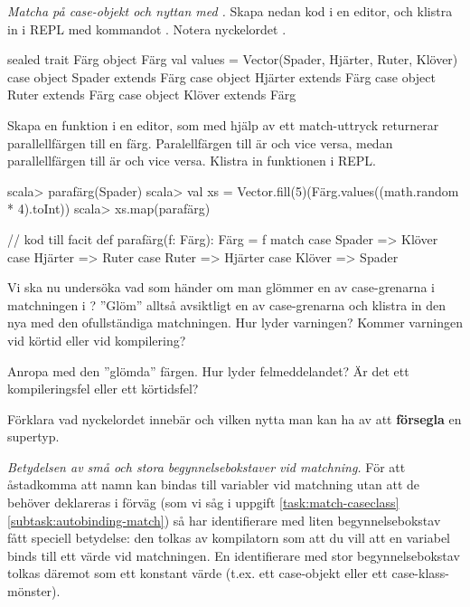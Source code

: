 \Task \emph{Matcha på case-objekt och nyttan med .} Skapa nedan kod i en editor, och klistra in i REPL med kommandot . Notera nyckelordet .
\begin{Code}
sealed trait Färg
object Färg { 
  val values = Vector(Spader, Hjärter, Ruter, Klöver) 
}
case object Spader  extends Färg
case object Hjärter extends Färg
case object Ruter   extends Färg
case object Klöver  extends Färg
\end{Code}

\Subtask Skapa en funktion  i en editor, som med hjälp av ett match-uttryck returnerar parallellfärgen till en färg. Paralellfärgen till  är  och vice versa, medan parallellfärgen till  är  och vice versa. Klistra in funktionen i REPL.
\begin{REPL}
scala> parafärg(Spader)
scala> val xs = Vector.fill(5)(Färg.values((math.random * 4).toInt))  
scala> xs.map(parafärg)
\end{REPL}

\begin{Code}
// kod till facit
def parafärg(f: Färg): Färg = f match {
  case Spader  => Klöver
  case Hjärter => Ruter
  case Ruter   => Hjärter
  case Klöver  => Spader
}
\end{Code}

\Subtask Vi ska nu undersöka vad som händer om man glömmer en av case-grenarna i matchningen i ? ''Glöm'' alltså avsiktligt en av case-grenarna och klistra in den nya  med den ofullständiga matchningen. Hur lyder varningen? Kommer varningen vid körtid eller vid kompilering? 

\Subtask Anropa  med den ''glömda'' färgen. Hur lyder felmeddelandet? Är det ett kompileringsfel eller ett körtidsfel?

\Subtask\Pen Förklara vad nyckelordet  innebär och vilken nytta man kan ha av att \textbf{försegla} en supertyp.


\Task \emph{Betydelsen av små och stora begynnelsebokstaver vid matchning.} För att åstadkomma att namn kan bindas till variabler vid matchning utan att de behöver deklareras i förväg (som vi såg i uppgift \ref{task:match-caseclass}\ref{subtask:autobinding-match}) så har identifierare med liten begynnelsebokstav fått speciell betydelse: den tolkas av kompilatorn som att du vill att en variabel  binds till ett värde vid matchningen. En identifierare med stor begynnelsebokstav tolkas däremot som ett konstant värde (t.ex. ett case-objekt eller ett case-klass-mönster).

